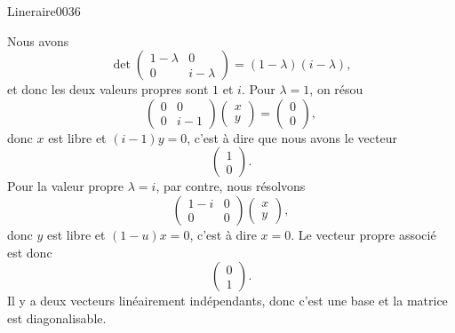 \begin{corrige}{Lineraire0036}

	Nous avons
	\begin{equation}
		\det\begin{pmatrix}
			1-\lambda	&	0	\\ 
			0	&	i-\lambda	
		\end{pmatrix}=(1-\lambda)(i-\lambda),
	\end{equation}
	et donc les deux valeurs propres sont $1$ et $i$. Pour $\lambda=1$, on résou
	\begin{equation}
		\begin{pmatrix}
			0	&	0	\\ 
			0	&	i-1	
		\end{pmatrix}\begin{pmatrix}
			x	\\ 
			y	
		\end{pmatrix}=\begin{pmatrix}
			0	\\ 
			0	
		\end{pmatrix},
	\end{equation}
	donc $x$ est libre et $(i-1)y=0$, c'est à dire que nous avons le vecteur
	\begin{equation}
		\begin{pmatrix}
			1	\\ 
			0	
		\end{pmatrix}.
	\end{equation}
	Pour la valeur propre $\lambda=i$, par contre, nous résolvons
	\begin{equation}
		\begin{pmatrix}
			1-i	&	0	\\ 
			0	&	0	
		\end{pmatrix}\begin{pmatrix}
			x	\\ 
			y	
		\end{pmatrix},
	\end{equation}
	donc $y$ est libre et $(1-u)x=0$, c'est à dire $x=0$. Le vecteur propre associé est donc
	\begin{equation}
		\begin{pmatrix}
			0	\\ 
			1	
		\end{pmatrix}.
	\end{equation}
	Il y a deux vecteurs linéairement indépendants, donc c'est une base et la matrice est diagonalisable.


\end{corrige}
